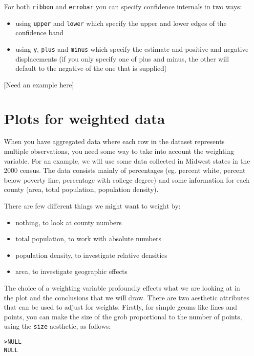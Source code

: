 For both {\tt ribbon} and {\tt errobar} you can specify confidence internals in two ways:

\begin{itemize}
	\item using {\tt upper} and {\tt lower} which specify the upper and lower edges of the confidence band

	\item using {\tt y}, {\tt plus} and {\tt minus} which specify the estimate and positive and negative displacements (if you only specify one of plus and minus, the other will default to the negative of the one that is supplied)
\end{itemize}

[Need an example here]

\section{Plots for weighted data}\label{sec:weighted_data}

When you have aggregated data where each row in the dataset represents multiple observations, you need some way to take into account the weighting variable.  For an example, we will use some data collected in Midwest states in the 2000 census.  The data consists mainly of percentages (eg. percent white, percent below poverty line, percentage with college degree) and some information for each county (area, total population, population density).

There are few different things we might want to weight by: 

\begin{itemize}
	\item nothing, to look at county numbers
	\item total population, to work with absolute numbers
	\item population density, to investigate relative densities
	\item area, to investigate geographic effects
\end{itemize}

\noindent The choice of a weighting variable profoundly effects what we are looking at in the plot and the conclusions that we will draw.  There are two aesthetic attributes that can be used to adjust for weights.  Firstly, for simple geoms like lines and points, you can make the size of the grob proportional to the number of points, using the {\tt size} aesthetic, as follows:

\begin{alltt}
> NULL
NULL
\end{alltt}

